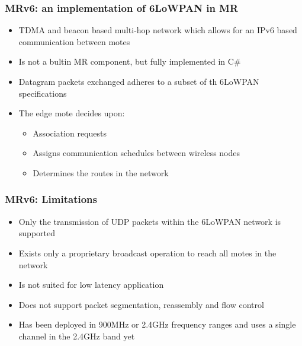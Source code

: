 \begin{frame}[fragile]
  \frametitle{MRv6: an implementation of 6LoWPAN in MR}
  \begin{itemize}
    \item TDMA and beacon based multi-hop network which allows for an IPv6 based communication between motes
    \item Is not a bultin MR component, but fully implemented in C\#
    \item Datagram packets exchanged adheres to a subset of th 6LoWPAN specifications
    \item The edge mote decides upon:
    \begin{itemize}
      \item Association requests
      \item Assigns communication schedules between wireless nodes
      \item Determines the routes in the network
    \end{itemize}
  \end{itemize}
\end{frame}

\begin{frame}[fragile]
  \frametitle{MRv6: Limitations}
  \begin{itemize}
    \item Only the transmission of UDP packets within the 6LoWPAN network is supported
    \item Exists only a proprietary broadcast operation to reach all motes in the network
    \item Is not suited for low latency application
    \item Does not support packet segmentation, reassembly and flow control
    \item Has been deployed in 900MHz or 2.4GHz frequency ranges and uses a single channel in the 2.4GHz band yet
  \end{itemize}
\end{frame}

